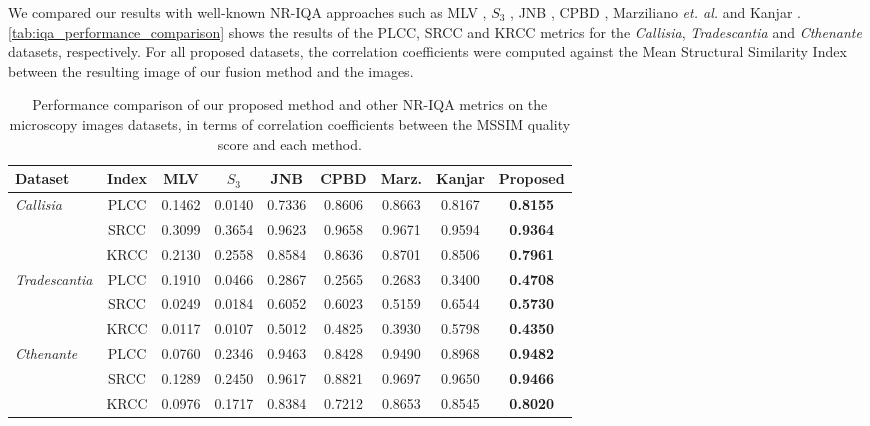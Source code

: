 We compared our results with well-known NR-IQA approaches such as MLV \cite{bahrami2014fast}, $S_{3}$ \cite{vu2012s3}, JNB \cite{ferzli2009noreference}, CPBD \cite{narvekar2011noreference}, Marziliano \textit{et. al.} \cite{marziliano2002noreference} and Kanjar \cite{kanjar2013image}. \autoref{tab:iqa_performance_comparison} shows the results of the PLCC, SRCC and KRCC metrics for the \textit{Callisia}, \textit{Tradescantia} and \textit{Cthenante} datasets, respectively. For all proposed datasets, the correlation coefficients were computed against the Mean Structural Similarity Index between the resulting image of our fusion method and the images.  

\begin{table}[ht]
    \centering
    \caption{Performance comparison of our proposed method and other NR-IQA metrics on the microscopy images datasets, in terms of correlation coefficients between the MSSIM quality score and each method.}
    \label{tab:iqa_performance_comparison}
    \begin{tabular}{lcccccccc}
        \toprule
        Dataset & Index & MLV & $S_{3}$ & JNB & CPBD & Marz. & Kanjar & \textbf{Proposed}\\
        \midrule
        
        \multirow{3}{*}{\textit{\small Callisia}} 
        & \small PLCC & 0.1462 & 0.0140 & 0.7336 & 0.8606 & 0.8663 & 0.8167 & \textbf{0.8155}\\
        & \small SRCC & 0.3099 & 0.3654 & 0.9623 & 0.9658 & 0.9671 & 0.9594 & \textbf{0.9364}\\
        & \small KRCC & 0.2130 & 0.2558 & 0.8584 & 0.8636 & 0.8701 & 0.8506 & \textbf{0.7961}\\
        
        \midrule
        
        \multirow{3}{*}{\textit{\small Tradescantia}}
        & \small PLCC & 0.1910 & 0.0466 & 0.2867 & 0.2565 & 0.2683 & 0.3400 & \textbf{0.4708}\\
        & \small SRCC & 0.0249 & 0.0184 & 0.6052 & 0.6023 & 0.5159 & 0.6544 & \textbf{0.5730}\\
        & \small KRCC & 0.0117 & 0.0107 & 0.5012 & 0.4825 & 0.3930 & 0.5798 & \textbf{0.4350}\\

        \midrule
        
        \multirow{3}{*}{\textit{\small Cthenante}} 
        & \small PLCC & 0.0760 & 0.2346 & 0.9463 & 0.8428 & 0.9490 & 0.8968 & \textbf{0.9482}\\
        & \small SRCC & 0.1289 & 0.2450 & 0.9617 & 0.8821 & 0.9697 & 0.9650 & \textbf{0.9466}\\
        & \small KRCC & 0.0976 & 0.1717 & 0.8384 & 0.7212 & 0.8653 & 0.8545 & \textbf{0.8020}\\
        

\end{tabular}
\end{table}
